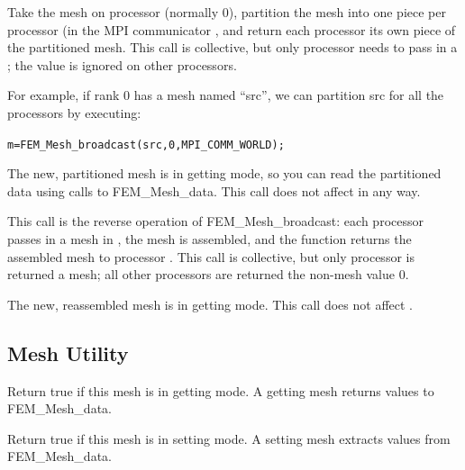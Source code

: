 Take the mesh  on processor  (normally 0), 
partition the mesh into one piece per processor (in the MPI communicator
, and return each processor its own piece 
of the partitioned mesh.  This call is collective, but only 
processor  needs to pass in a ; the 
 value is ignored on other processors.

For example, if rank 0 has a mesh named ``src'', we can 
partition src for all the processors by executing:
\begin{alltt}
  m=FEM_Mesh_broadcast(src,0,MPI_COMM_WORLD);
\end{alltt}

The new, partitioned mesh is in getting mode, so 
you can read the partitioned data using calls to FEM\_Mesh\_data.
This call does not affect  in any way.

  

This call is the reverse operation of FEM\_Mesh\_broadcast:
each processor passes in a mesh in , the mesh is 
assembled, and the function returns the assembled mesh
to processor .  This call is collective, but 
only processor  is returned a mesh; all other
processors are returned the non-mesh value 0.

The new, reassembled mesh is in getting mode.
This call does not affect .


\subsection{Mesh Utility}


Return true if this mesh is in getting mode.
A getting mesh returns values to FEM\_Mesh\_data.


Return true if this mesh is in setting mode.
A setting mesh extracts values from FEM\_Mesh\_data.



